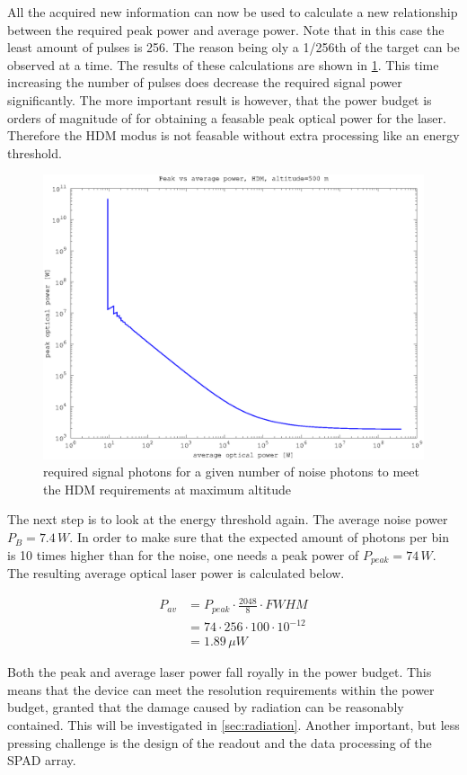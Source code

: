 All the acquired new information can now be used to calculate a new relationship between the required peak power and average power. Note that in this case the least amount of pulses is 256. The reason being oly a 1/256th of the target can be observed at a time. The results of these calculations are shown in \cref{fig:hdm_peak_vs_av}. This time increasing the number of pulses does decrease the required signal power significantly. The more important result is however, that the power budget is orders of magnitude of for obtaining a feasable peak optical power for the laser. Therefore the HDM modus is not feasable without extra processing like an energy threshold.

\begin{figure}[h]
\centering
	\includegraphics[width=0.8\linewidth]{fig/hdm_peak_vs_av.eps}
\caption{required signal photons for a given number of noise photons to meet the HDM requirements at maximum altitude}
\label{fig:hdm_peak_vs_av}
\end{figure}

The next step is to look at the energy threshold again. The average noise power $P_B=7.4\,W$. In order to make sure that the expected amount of photons per bin is 10 times higher than for the noise, one needs a peak power of $P_{peak}=74\,W$. The resulting average optical laser power is calculated below.

\begin{align*}
	P_{av}&=P_{peak}\cdot\frac{2048}{8}\cdot FWHM\\
	&= 74\cdot256\cdot100\cdot10^{-12}\\
	&= 1.89\,\mu W
\end{align*}

Both the peak and average laser power fall royally in the power budget. This means that the device can meet the resolution requirements within the power budget, granted that the damage caused by radiation can be reasonably contained. This will be investigated in \cref{sec:radiation}. Another important, but less pressing challenge is the design of the readout and the data processing of the SPAD array. 
